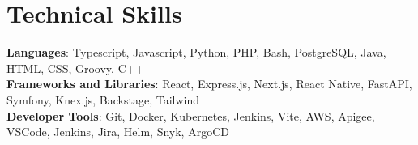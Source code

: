 \documentclass[letterpaper,11pt]{article}
\newcommand{\resumeItem}[1]{
  \item\small{
    {#1 \vspace{-2pt}}
  }
}
\newcommand{\resumeItemListStart}{\begin{itemize}}
\newcommand{\resumeItemListEnd}{\end{itemize}\vspace{-10pt}}
\begin{document}


%
\section{Technical Skills}
 \begin{itemize}[leftmargin=0.15in, label={}]
    \small{\item{
     \textbf{Languages}{: Typescript, Javascript, Python, PHP, Bash, PostgreSQL, Java, HTML, CSS, Groovy, C++} \\
     \textbf{Frameworks and Libraries}{: React, Express.js, Next.js, React Native, FastAPI, Symfony, Knex.js, Backstage, Tailwind} \\
     \textbf{Developer Tools}{: Git, Docker, Kubernetes, Jenkins, Vite, AWS, Apigee, VSCode, Jenkins, Jira, Helm, Snyk, ArgoCD} \\
    }}
 \end{itemize}


\end{document}
